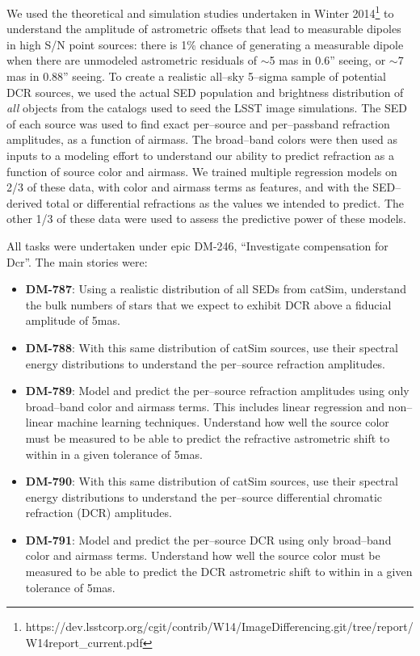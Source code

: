 \documentclass[DM,toc]{lsstdoc}
\begin{document}
We used the theoretical and simulation studies undertaken in Winter
2014\footnote{https://dev.lsstcorp.org/cgit/contrib/W14/ImageDifferencing.git/tree/report/W14report\_current.pdf}
to understand the amplitude of astrometric offsets that lead to
measurable dipoles in high S/N point sources: there is 1\% chance of
generating a measurable dipole when there are unmodeled astrometric
residuals of $\sim$5 mas in 0.6'' seeing, or $\sim$7 mas in 0.88''
seeing.  To create a realistic all--sky 5--sigma sample of potential
DCR sources, we used the actual SED population and brightness
distribution of {\it all} objects from the catalogs used to seed the
LSST image simulations.  The SED of each source was used to find exact
per--source and per--passband refraction amplitudes, as a function of
airmass.  The broad--band colors were then used as inputs to a
modeling effort to understand our ability to predict refraction as a
function of source color and airmass.  We trained multiple regression
models on 2/3 of these data, with color and airmass terms as features,
and with the SED--derived total or differential refractions as the
values we intended to predict.  The other 1/3 of these data were used
to assess the predictive power of these models.

All tasks were undertaken under epic DM-246, ``Investigate
compensation for Dcr''.  The main stories were:

\begin{itemize}

\item {\bf DM-787}: Using a realistic distribution of all SEDs from
  catSim, understand the bulk numbers of stars that we expect to
  exhibit DCR above a fiducial amplitude of 5mas.

\item {\bf DM-788}: With this same distribution of catSim sources, use
  their spectral energy distributions to understand the per--source
  refraction amplitudes.

\item {\bf DM-789}: Model and predict the per--source refraction
  amplitudes using only broad--band color and airmass terms.  This
  includes linear regression and non--linear machine learning
  techniques.  Understand how well the source color must be measured
  to be able to predict the refractive astrometric shift to within in
  a given tolerance of 5mas.

\item {\bf DM-790}: With this same distribution of catSim sources, use
  their spectral energy distributions to understand the per--source
  differential chromatic refraction (DCR) amplitudes.

\item {\bf DM-791}: Model and predict the per--source DCR using only
  broad--band color and airmass terms.  Understand how well the source
  color must be measured to be able to predict the DCR astrometric
  shift to within in a given tolerance of 5mas.

\end{itemize}
\end{document}
